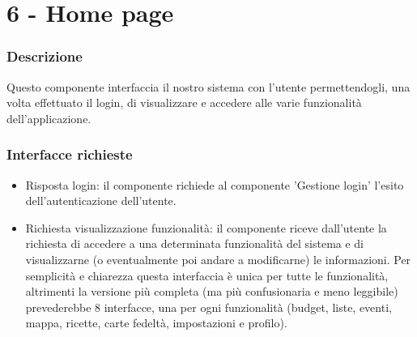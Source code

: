 \documentclass[a4paper,12pt]{article}
\begin{document}
\section*{6 -  Home page}
\subsubsection*{Descrizione}
Questo componente interfaccia il nostro sistema con l'utente permettendogli, una volta effettuato il login, di visualizzare e accedere alle varie funzionalità dell'applicazione. 
\subsubsection*{Interfacce richieste}
\begin{itemize} \setlength\itemsep{0.01em}
\item {\sffamily Risposta login}: il componente richiede al componente 'Gestione login' l'esito dell'autenticazione dell'utente.
\item {\sffamily Richiesta visualizzazione funzionalità}: il componente riceve dall'utente la richiesta di accedere a una determinata funzionalità del sistema e di visualizzarne (o eventualmente poi andare a modificarne) le informazioni. Per semplicità e chiarezza questa interfaccia è unica per tutte le funzionalità, altrimenti la versione più completa (ma più confusionaria e meno leggibile) prevederebbe 8 interfacce, una per ogni funzionalità (budget, liste, eventi, mappa, ricette, carte fedeltà, impostazioni e profilo).

\end{itemize}
\end{document}
